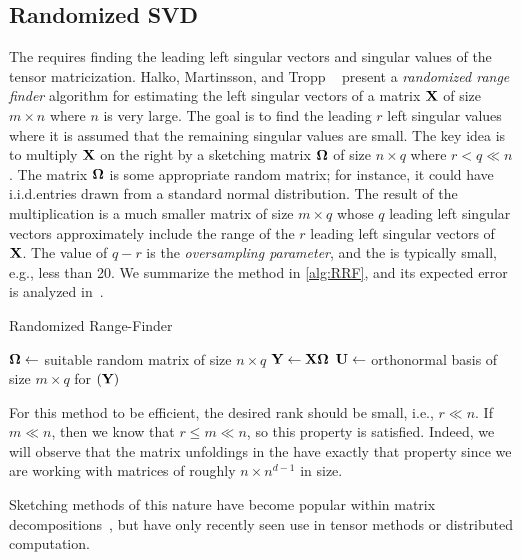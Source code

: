 \subsection{Randomized SVD}
\label{sec:randsvd}
The \MTFSBC requires finding the leading left singular vectors and singular values of the tensor 
matricization. Halko, Martinsson, and Tropp ~\cite[Alg.~4.1]{halko} present a \emph{randomized range finder} algorithm 
for estimating the left singular vectors of a matrix $\M{X}$ of size $m \times n$ where $n$ is very large.
The goal is to find the leading $r$ left singular values where it is assumed that the remaining singular values are small.
The key idea is to multiply $\M{X}$ on the right
by a sketching matrix $\M{\Omega}$ of size $n \times q$ where $r < q \ll n$.
The matrix $\M{\Omega}$ is some appropriate random matrix;
for instance, it could have i.i.d.\@ entries drawn from a standard normal distribution.
The result of the multiplication is a much smaller matrix of size $m \times q$ whose $q$ leading left singular vectors approximately include the range of the $r$ leading left singular vectors of $\M{X}$.
The value of $q-r$ is the \emph{oversampling parameter}, and the is typically small, e.g., less than 20.
We summarize the method in \cref{alg:RRF}, and its expected error is analyzed in~\cite{halko}.

\begin{algorithm}[htb]
  \caption{Randomized Range-Finder}\label{alg:RRF}
  \begin{algorithmic}[1]
     
    \State $\M{\Omega} \gets$ suitable random matrix of size ${n \times q}$ 
    \State $\M{Y} \gets \M{X}\M{\Omega}$
    \State \label{line:rrf:ortho} $\M{U} \gets$ orthonormal basis of size $m \times q$ for $(\M{Y})$
    \EndProcedure
  \end{algorithmic}
  \label{alg:rrf}
\end{algorithm}

For this method to be efficient, the desired rank should be small, i.e., $r \ll n$.
If $m \ll n$, then we know that $r \leq m \ll n$, so this property is satisfied. Indeed, we will observe that the matrix
unfoldings in the \MTFSBC have exactly that property since we are working with matrices of roughly 
$n \times n^{d-1}$ in size. 

Sketching methods of this nature have become popular within matrix decompositions~\cite{tropp2}, but have only recently seen use in tensor methods or distributed computation. 
%
